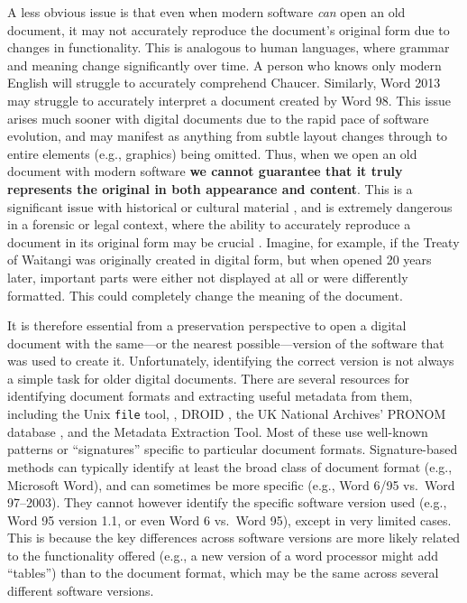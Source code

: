 \documentclass[12pt]{article}
\begin{document}
A less obvious issue is that even when modern software \emph{can} open an old document, it may not accurately reproduce the document’s original form due to changes in functionality. This is analogous to human languages, where grammar and meaning change significantly over time. A person who knows only modern English will struggle to accurately comprehend Chaucer. Similarly, Word 2013 may struggle to accurately interpret a document created by Word 98. This issue arises much sooner with digital documents due to the rapid pace of software evolution, and may manifest as anything from subtle layout changes through to entire elements (e.g., graphics) being omitted. Thus, when we open an old document with modern software \textbf{we cannot guarantee that it truly represents the original in both appearance and content}. This is a significant issue with historical or cultural material \cite{Kolowich.S-2009a-Archiving}, and is extremely dangerous in a forensic or legal context, where the ability to accurately reproduce a document in its original form may be crucial \cite{Gillespie.J-2004a-Coping}. Imagine, for example, if the Treaty of Waitangi was originally created in digital form, but when opened 20 years later, important parts were either not displayed at all or were differently formatted. This could completely change the meaning of the document.

It is therefore essential from a preservation perspective to open a digital document with the same—or the nearest possible—version of the software that was used to create it. Unfortunately, identifying the correct version is not always a simple task for older digital documents. There are several resources for identifying document formats and extracting useful metadata from them, including the Unix \texttt{file} tool, , DROID \cite{Brown.A-2006a-Automatic}, the UK National Archives’ PRONOM database \cite{Brown.A-2006a-PRONOM}, and the  Metadata Extraction Tool. Most of these use well-known patterns or “signatures” specific to particular document formats. Signature-based methods can typically identify at least the broad class of document format (e.g., Microsoft Word), and can sometimes be more specific (e.g., Word 6/95 vs.\ Word 97–2003). They cannot however identify the specific software version used (e.g., Word 95 version 1.1, or even Word 6 vs.\ Word 95), except in very limited cases. This is because the key differences across software versions are more likely related to the functionality offered (e.g., a new version of a word processor might add “tables”) than to the document format, which may be the same across several different software versions.
\end{document}
